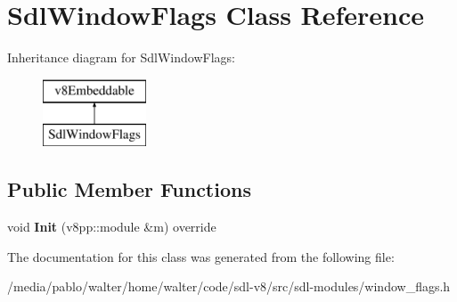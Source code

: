 \hypertarget{classSdlWindowFlags}{}\section{Sdl\+Window\+Flags Class Reference}
\label{classSdlWindowFlags}
Inheritance diagram for Sdl\+Window\+Flags\+:\begin{figure}[H]
\begin{center}
\leavevmode
\includegraphics[height=2.000000cm]{classSdlWindowFlags}
\end{center}
\end{figure}
\subsection*{Public Member Functions}
\begin{DoxyCompactItemize}
\item 
\mbox{\label{classSdlWindowFlags_a8fdfc382ad10e00c65362fd3da9a6253}} 
void {\bfseries Init} (v8pp\+::module \&m) override
\end{DoxyCompactItemize}


The documentation for this class was generated from the following file\+:\begin{DoxyCompactItemize}
\item 
/media/pablo/walter/home/walter/code/sdl-\/v8/src/sdl-\/modules/window\+\_\+flags.\+h\end{DoxyCompactItemize}
